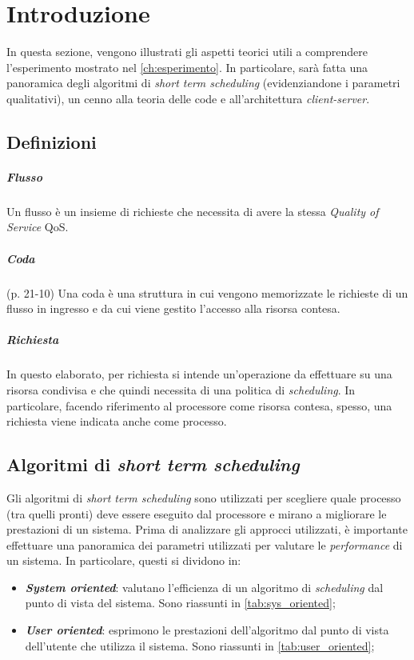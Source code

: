 \chapter{Introduzione}
In questa sezione, vengono illustrati gli aspetti teorici utili a comprendere l'esperimento mostrato nel \cref{ch:esperimento}. In particolare, sarà fatta una panoramica degli algoritmi di \textit{short term scheduling} (evidenziandone i parametri qualitativi), un cenno alla teoria delle code e all'architettura \textit{client-server}.

\section{Definizioni}

\paragraph{Flusso}\cite{shreedhar1996efficient}
Un flusso è un insieme di richieste che necessita di avere la stessa \textit{Quality of Service} QoS.

\paragraph{Coda}\cite{stallingsos}(p. 21-10)
Una coda è una struttura in cui vengono memorizzate le richieste di un flusso in ingresso e da cui viene gestito l'accesso alla risorsa contesa.

\paragraph{Richiesta}
In questo elaborato, per richiesta si intende un'operazione da effettuare su una risorsa condivisa e che quindi necessita di una politica di \textit{scheduling}. In particolare, facendo riferimento al processore come risorsa contesa, spesso, una richiesta viene indicata anche come processo.

\section{Algoritmi di \textit{short term scheduling}}\label{s:scheduling}
Gli algoritmi di \textit{short term scheduling} sono utilizzati per scegliere quale processo (tra quelli pronti) deve essere eseguito dal processore e mirano a migliorare le prestazioni di un sistema. Prima di analizzare gli approcci utilizzati, è importante effettuare una panoramica dei parametri utilizzati per valutare le \textit{performance} di un sistema. In particolare, questi si dividono in:
\begin{itemize}
    \item \textbf{\textit{System oriented}}: valutano l'efficienza di un algoritmo di \textit{scheduling} dal punto di vista del sistema. Sono riassunti in \cref{tab:sys_oriented};
    \item \textbf{\textit{User oriented}}: esprimono le prestazioni dell'algoritmo dal punto di vista dell'utente che utilizza il sistema. Sono riassunti in \cref{tab:user_oriented};
\end{itemize}


